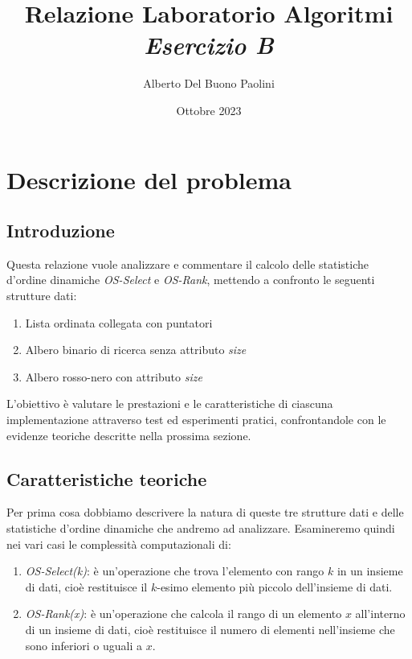 \documentclass[onecolumn]{article}
\title{Relazione Laboratorio Algoritmi\\\textit{Esercizio B}}
\author{Alberto Del Buono Paolini}
\date{Ottobre 2023}
\begin{document}
\begin{onecolumn}
	\vspace*{-6em}
	{\let\newpage\relax\maketitle}
	\vspace*{-2em}
	\tableofcontents
\end{onecolumn}
\vspace{1cm}
\pagebreak

\section{Descrizione del problema}

\subsection{Introduzione}
Questa relazione vuole analizzare e commentare il calcolo delle statistiche d'ordine dinamiche \textit{OS-Select} e \textit{OS-Rank}, mettendo a confronto le seguenti strutture dati: 
\begin{enumerate}
	\setlength\itemsep{-0.25em}
	\item Lista ordinata collegata con puntatori
	\item Albero binario di ricerca senza attributo \textit{size}
	\item Albero rosso-nero con attributo \textit{size}
\end{enumerate}

L'obiettivo è valutare le prestazioni e le caratteristiche di ciascuna implementazione attraverso test ed esperimenti pratici, confrontandole con le evidenze teoriche descritte nella prossima sezione.

\subsection{Caratteristiche teoriche}

Per prima cosa dobbiamo descrivere la natura di queste tre strutture dati e delle statistiche d'ordine dinamiche che andremo ad analizzare. Esamineremo quindi nei vari casi le complessità computazionali di:

\begin{enumerate}
	\setlength\itemsep{-0.25em}
	\item \textit{OS-Select(k)}: è un'operazione che trova l'elemento con rango $k$ in un insieme di dati, cioè restituisce il $k$-esimo elemento più piccolo dell'insieme di dati.
	\item \textit{OS-Rank(x)}: è un'operazione che calcola il rango di un elemento $x$ all'interno di un insieme di dati, cioè restituisce il numero di elementi nell'insieme che sono inferiori o uguali a $x$.
\end{enumerate}
\end{document}
